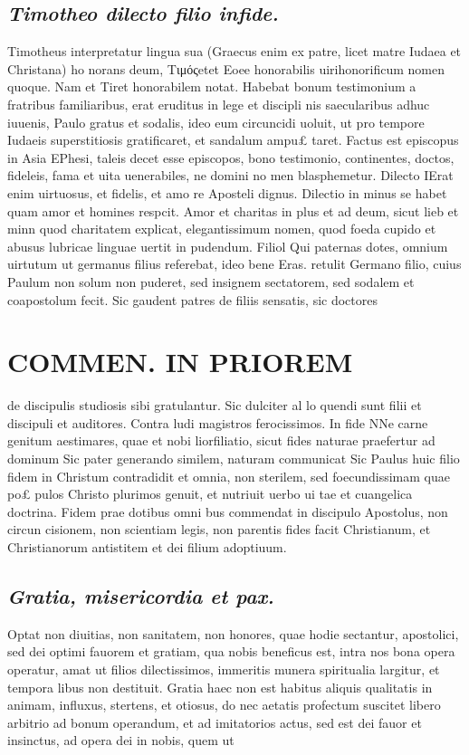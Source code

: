 \documentclass{article}
\begin{document}
\begin{pages}
\subsection*{\textit{Timotheo dilecto filio infide. }}\pstart Timotheus interpretatur lingua sua (Graecus enim ex patre, licet matre Iudaea et Christana) ho norans deum, Τιμόςetet Eoee honorabilis uirihonorificum nomen quoque. Nam et Tiret honorabilem notat. Habebat bonum testimonium a fratribus familiaribus, erat eruditus in lege et discipli nis saecularibus adhuc iuuenis, Paulo gratus et sodalis, ideo eum circuncidi uoluit, ut pro tempore Iudaeis superstitiosis gratificaret, et sandalum ampu£ taret. Factus est episcopus in Asia EPhesi, taleis decet esse episcopos, bono testimonio, continentes, doctos, fideleis, fama et uita uenerabiles, ne domini no men blasphemetur.  \pend\pstart Dilecto IErat enim uirtuosus, et fidelis, et amo re Aposteli dignus. Dilectio in minus se habet quam amor et homines respcit. Amor et charitas in plus et ad deum, sicut lieb et minn quod charitatem explicat, elegantissimum nomen, quod foeda cupido et abusus lubricae linguae uertit in pudendum.  \pend\pstart Filiol Qui paternas dotes, omnium uirtutum ut germanus filius referebat, ideo bene Eras. retulit Germano filio, cuius Paulum non solum non puderet, sed insignem sectatorem, sed sodalem et coapostolum fecit. Sic gaudent patres de filiis sensatis, sic doctores  \pend
\section*{COMMEN. IN PRIOREM }
\marginpar{[ p.8 ]}\pstart de discipulis studiosis sibi gratulantur. Sic dulciter al lo quendi sunt filii et discipuli et auditores. Contra ludi magistros ferocissimos.  \pend\pstart In fide NNe carne genitum aestimares, quae et nobi liorfiliatio, sicut fides naturae praefertur ad dominum Sic pater generando similem, naturam communicat Sic Paulus huic filio fidem in Christum contradidit et omnia, non sterilem, sed foecundissimam quae po£ pulos Christo plurimos genuit, et nutriuit uerbo ui tae et cuangelica doctrina. Fidem prae dotibus omni bus commendat in discipulo Apostolus, non circun cisionem, non scientiam legis, non parentis fides facit Christianum, et Christianorum antistitem et dei filium adoptiuum.  \pend
{}
{}
\subsection*{\textit{Gratia, misericordia et pax. }}\pstart Optat non diuitias, non sanitatem, non honores, quae hodie sectantur, apostolici, sed dei optimi fauorem et gratiam, qua nobis beneficus est, intra nos bona opera operatur, amat ut filios dilectissimos, immeritis munera spiritualia largitur, et tempora libus non destituit. Gratia haec non est habitus aliquis qualitatis in animam, influxus, stertens, et otiosus, do nec aetatis profectum suscitet libero arbitrio ad bonum operandum, et ad imitatorios actus, sed est dei fauor et insinctus, ad opera dei in nobis, quem ut  \pend

\end{pages}
\end{document}
